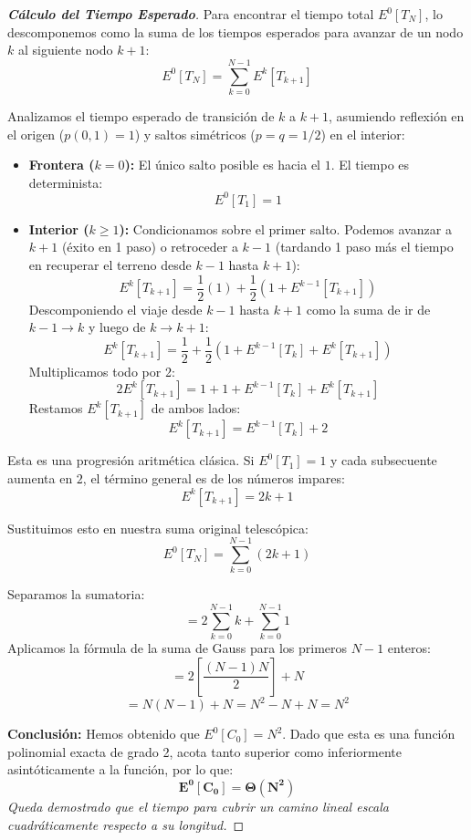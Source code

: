 \documentclass[10pt,a4paper]{article}
\begin{document}
\begin{proof}[\textbf{Cálculo del Tiempo Esperado}]
    Para encontrar el tiempo total $E^0[T_N]$, lo descomponemos como la suma de los tiempos esperados para avanzar de un nodo $k$ al siguiente nodo $k+1$:
    \[ E^0[T_N] = \sum_{k=0}^{N-1} E^k[T_{k+1}] \]
    
    Analizamos el tiempo esperado de transición de $k$ a $k+1$, asumiendo reflexión en el origen ($p(0,1) = 1$) y saltos simétricos ($p=q=1/2$) en el interior:
    \begin{itemize}
        \item \textbf{Frontera ($k=0$):} El único salto posible es hacia el $1$. El tiempo es determinista:
        \[ E^0[T_1] = 1 \]
        
        \item \textbf{Interior ($k \ge 1$):} Condicionamos sobre el primer salto. Podemos avanzar a $k+1$ (éxito en 1 paso) o retroceder a $k-1$ (tardando 1 paso más el tiempo en recuperar el terreno desde $k-1$ hasta $k+1$):
        \[ E^k[T_{k+1}] = \frac{1}{2}(1) + \frac{1}{2}(1 + E^{k-1}[T_{k+1}]) \]
        Descomponiendo el viaje desde $k-1$ hasta $k+1$ como la suma de ir de $k-1 \to k$ y luego de $k \to k+1$:
        \[ E^k[T_{k+1}] = \frac{1}{2} + \frac{1}{2}\left(1 + E^{k-1}[T_k] + E^k[T_{k+1}]\right) \]
        Multiplicamos todo por 2:
        \[ 2 E^k[T_{k+1}] = 1 + 1 + E^{k-1}[T_k] + E^k[T_{k+1}] \]
        Restamos $E^k[T_{k+1}]$ de ambos lados:
        \[ E^k[T_{k+1}] = E^{k-1}[T_k] + 2 \]
    \end{itemize}
    
    Esta es una progresión aritmética clásica. Si $E^0[T_1] = 1$ y cada subsecuente aumenta en $2$, el término general es de los números impares:
    \[ E^k[T_{k+1}] = 2k + 1 \]
    
    Sustituimos esto en nuestra suma original telescópica:
    \[ E^0[T_N] = \sum_{k=0}^{N-1} (2k + 1) \]
    
    Separamos la sumatoria:
    \[ = 2 \sum_{k=0}^{N-1} k + \sum_{k=0}^{N-1} 1 \]
    Aplicamos la fórmula de la suma de Gauss para los primeros $N-1$ enteros:
    \[ = 2 \left[ \frac{(N-1)N}{2} \right] + N \]
    \[ = N(N-1) + N = N^2 - N + N = N^2 \]
    
    \textbf{Conclusión:}
    Hemos obtenido que $E^0[C_0] = N^2$. Dado que esta es una función polinomial exacta de grado 2, acota tanto superior como inferiormente asintóticamente a la función, por lo que:
    \[ \mathbf{E^0[C_0] = \Theta(N^2)} \]
    \textit{Queda demostrado que el tiempo para cubrir un camino lineal escala cuadráticamente respecto a su longitud.}
\end{proof}
\end{document}
